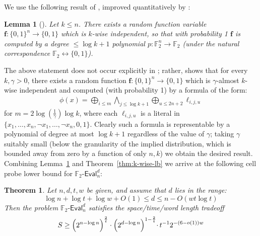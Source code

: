 \documentclass[11pt]{article}
\newtheorem{theorem}{Theorem}
\newtheorem{lemma}{Lemma}
\newcommand{\dash}{\text{-}}
\newcommand{\B}{\{0,1\}}
\begin{document}
We use the following result of \cite{razborov-ramsey}, improved quantitatively by \cite{savicky1995improved}:
\begin{lemma}[\cite{razborov-ramsey,savicky1995improved}]\label{lem:savicky}
Let $k \leq n$. There exists a random function variable $\bm{f}: \B^n \to \B$ which is $k$-wise independent, so that with probability 1 $\bm{f}$ is computed by a degree $\leq \log k+1$ polynomial $p: \mathbb{F}_2^n \to \mathbb{F}_2$ (under the natural correspondence $\mathbb{F}_2 \leftrightarrow \B$).
\end{lemma}
The above statement does not occur explicitly in \cite{razborov-ramsey,savicky1995improved}; rather, \cite{savicky1995improved} shows that for every $k, \gamma >0$, there exists a random function $\bm{f}: \B^n \to \B$ which is $\gamma$-almost $k$-wise independent and computed (with probability 1) by a formula of the form:
\begin{gather}
\phi(x) = \mathop{\bigoplus}\limits_{i\leq m}\mathop{\bigwedge}\limits_{j \leq \log k + 1}  \mathop{\bigoplus}\limits_{u \leq 2n+2} \ell_{i,j,u} \label{eq:savicky}
\end{gather}
for $m= 2\log(\frac{1}{\gamma})\log k$, where each $\ell_{i,j,u}$ is a literal in $\{x_1,\ldots,x_n, \lnot x_1,\ldots,\lnot x_n,0,1\}$. Clearly such a formula is representable by a polynomial of degree at most $\log k+1$ regardless of the value of $\gamma$; taking $\gamma$ suitably small (below the granularity of the implied distribution, which is bounded away from zero by a function of only $n,k$) we obtain the desired result.
Combining Lemma~\ref{lem:savicky} and Theorem~\ref{thm:k-wise-lb} we arrive at the following cell probe lower bound for $\mathbb{F}_2\dash\mathsf{Eval}_n^d$:
\begin{theorem}
Let $n,d,t,w$ be given, and assume that $d$ lies in the range:
\[
 \log n  + \log t +\log w +  O(1) \leq d \leq n - O(wt\log t)
\]
Then the problem $\mathbb{F}_2\dash\mathsf{Eval}_n^d$ satisfies the space/time/word length tradeoff
    \[
S \geq \Bigl(2^{n-\log n}\Bigr)^{\frac{2}{t}} \cdot \Bigl(2^{d  - \log n}\Bigl)^{1 - \frac{2}{t}}  \cdot\,t^{-1}2^{-(6-o(1))w }
\]
\end{theorem}
\end{document}
